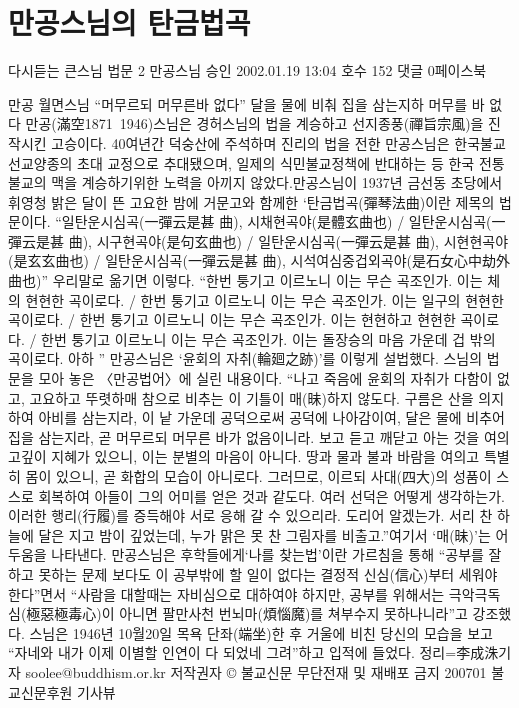 \documentclass[12pt, a4paper, oneside]{book}
\let\stdsection\section
\renewcommand\section{\newpage\stdsection}
\begin{document}
	\section{ 만공스님의 탄금법곡 }



다시듣는 큰스님 법문 2 만공스님
 승인 2002.01.19 13:04 호수 152 댓글 0페이스북

만공 월면스님
“머무르되 머무른바 없다” 달을 물에 비춰 집을 삼는지하 머무를 바 없다 만공(滿空1871~1946)스님은 경허스님의 법을 계승하고 선지종풍(禪旨宗風)을 진작시킨 고승이다. 40여년간 덕숭산에 주석하며 진리의 법을 전한 만공스님은 한국불교 선교양종의 초대 교정으로 추대됐으며, 일제의 식민불교정책에 반대하는 등 한국 전통불교의 맥을 계승하기위한 노력을 아끼지 않았다.만공스님이 1937년 금선동 초당에서 휘영청 밝은 달이 뜬 고요한 밤에 거문고와 함께한 ‘탄금법곡(彈琴法曲)이란 제목의 법문이다. “일탄운시심곡(一彈云是甚 曲), 시채현곡야(是體玄曲也) / 일탄운시심곡(一彈云是甚 曲), 시구현곡야(是句玄曲也) / 일탄운시심곡(一彈云是甚 曲), 시현현곡야(是玄玄曲也) / 일탄운시심곡(一彈云是甚 曲), 시석여심중겁외곡야(是石女心中劫外曲也)” 우리말로 옮기면 이렇다. “한번 퉁기고 이르노니 이는 무슨 곡조인가. 이는 체의 현현한 곡이로다. / 한번 퉁기고 이르노니 이는 무슨 곡조인가. 이는 일구의 현현한 곡이로다. / 한번 퉁기고 이르노니 이는 무슨 곡조인가. 이는 현현하고 현현한 곡이로다. / 한번 퉁기고 이르노니 이는 무슨 곡조인가. 이는 돌장승의 마음 가운데 겁 밖의 곡이로다. 아하 ” 만공스님은 ‘윤회의 자취(輪廻之跡)’를 이렇게 설법했다. 스님의 법문을 모아 놓은 〈만공법어〉에 실린 내용이다. “나고 죽음에 윤회의 자취가 다함이 없고, 고요하고 뚜렷하매 참으로 비추는 이 기틀이 매(昧)하지 않도다. 구름은 산을 의지하여 아비를 삼는지라, 이 낱 가운데 공덕으로써 공덕에 나아감이여, 달은 물에 비추어 집을 삼는지라, 곧 머무르되 머무른 바가 없음이니라. 보고 듣고 깨닫고 아는 것을 여의고깊이 지혜가 있으니, 이는 분별의 마음이 아니다. 땅과 물과 불과 바람을 여의고 특별히 몸이 있으니, 곧 화합의 모습이 아니로다. 그러므로, 이르되 사대(四大)의 성품이 스스로 회복하여 아들이 그의 어미를 얻은 것과 같도다. 여러 선덕은 어떻게 생각하는가. 이러한 행리(行履)를 증득해야 서로 응해 갈 수 있으리라. 도리어 알겠는가. 서리 찬 하늘에 달은 지고 밤이 깊었는데, 누가 맑은 못 찬 그림자를 비출고.”여기서 ‘매(昧)’는 어두움을 나타낸다. 만공스님은 후학들에게‘나를 찾는법’이란 가르침을 통해 “공부를 잘하고 못하는 문제 보다도 이 공부밖에 할 일이 없다는 결정적 신심(信心)부터 세워야 한다”면서 “사람을 대할때는 자비심으로 대하여야 하지만, 공부를 위해서는 극악극독심(極惡極毒心)이 아니면 팔만사천 번뇌마(煩惱魔)를 쳐부수지 못하나니라”고 강조했다. 스님은 1946년 10월20일 목욕 단좌(端坐)한 후 거울에 비친 당신의 모습을 보고 “자네와 내가 이제 이별할 인연이 다 되었네 그려”하고 입적에 들었다. 정리=李成洙기자 soolee@buddhism.or.kr
저작권자 © 불교신문 무단전재 및 재배포 금지
200701 불교신문후원 기사뷰
\end{document}
